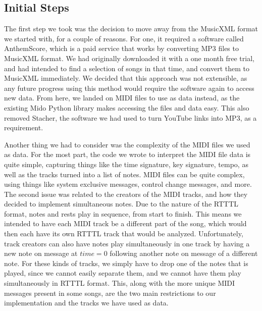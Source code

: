 \documentclass{article}
\begin{document}
\subsection{Initial Steps}
The first step we took was the decision to move away from the MusicXML format we started with, for a couple of reasons. For one, it required a software called AnthemScore, 
which is a paid service that works by converting MP3 files to MusicXML format. We had originally downloaded it with a one month free trial, and had intended to find a 
selection of songs in that time, and convert them to MusicXML immediately. We decided that this approach was not extensible, as any future progress using this method would 
require the software again to access new data. From here, we landed on MIDI files to use as data instead, as the existing Mido Python library makes accessing the files and 
data easy. This also removed Stacher, the software we had used to turn YouTube links into MP3, as a requirement.

Another thing we had to consider was the complexity of the MIDI files we used as data. For the most part, the code we wrote to interpret the MIDI file data is quite simple, 
capturing things like the time signature, key signature, tempo, as well as the tracks turned into a list of notes. MIDI files can be quite complex, using things like 
system exclusive messages, control change messages, and more. The second issue was related to the creators of the MIDI tracks, and how they decided to implement simultaneous 
notes. Due to the nature of the RTTTL format, notes and rests play in sequence, from start to finish. This means we intended to have each MIDI track be a different part of 
the song, which would then each have its own RTTTL track that would be analyzed. Unfortunately, track creators can also have notes play simultaneously in one track by having 
a new note on message at $time = 0$ following another note on message of a different note. For these kinds of tracks, we simply have to drop one of the notes that is played, 
since we cannot easily separate them, and we cannot have them play simultaneously in RTTTL format. This, along with the more unique MIDI messages present in some songs, are 
the two main restrictions to our implementation and the tracks we have used as data. \\
\end{document}
